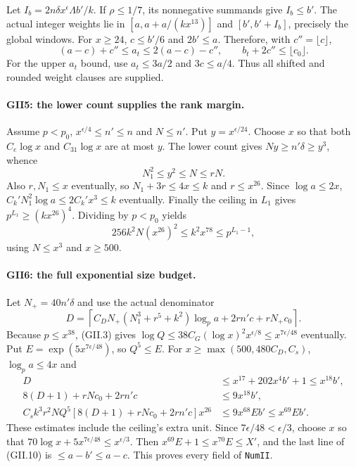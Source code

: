 Let $I_b=2n\delta x^\epsilon\Lambda b'/k$. If $\rho\le1/7$, its
nonnegative summands give $I_b\le b'$. The actual integer weights lie in
$[a,a+a/(kx^{13})]$ and $[b',b'+I_b]$, precisely the global windows.
For $x\ge24$, $c\le b'/6$ and $2b'\le a$. Therefore, with
$c''=\lfloor c\rfloor$,
\[
 (a-c)+c''\le a_t\le2(a-c)-c'',\qquad
 b_t+2c''\le\lfloor c_0\rfloor.\tag{GII.6}
\]
For the upper $a_t$ bound, use $a_t\le3a/2$ and $3c\le a/4$.
Thus all shifted and rounded weight clauses are supplied.

\paragraph{GII5: the lower count supplies the rank margin.}
Assume $p<p_0$, $x^{\epsilon/4}\le n'\le n$ and $N\le n'$.
Put $y=x^{\epsilon/24}$. Choose $x$ so that both $C_e\log x$ and
$C_{31}\log x$ are at most $y$. The lower count gives
$Ny\ge n'\delta\ge y^3$, whence
\[
 N_1^2\le y^2\le N\le rN.\tag{GII.7}
\]
Also $r,N_1\le x$ eventually, so $N_1+3r\le4x\le k$ and
$r\le x^{26}$. Since $\log a\le2x$,
$C_k'N_1^2\log a\le2C_k'x^3\le k$ eventually. Finally the ceiling in
$L_1$ gives $p^{L_1}\ge(kx^{26})^4$. Dividing by $p<p_0$ yields
\[
 256k^2N(x^{26})^2\le k^2x^{78}\le p^{L_1-1},\tag{GII.8}
\]
using $N\le x^3$ and $x\ge500$.

\paragraph{GII6: the full exponential size budget.}
Let $N_+=40n'\delta$ and use the actual denominator
\[
 D=\left\lceil C_DN_+(N_1^3+r^5+k^2)\log_pa
                 +2rn'c+rN_+c_0\right\rceil.\tag{GII.9}
\]
Because $p\le x^{38}$, (GII.3) gives
$\log Q\le38C_G(\log x)^2x^{\epsilon/8}\le x^{7\epsilon/48}$
eventually. Put $E=\exp(5x^{7\epsilon/48})$, so $Q^5\le E$.
For $x\ge\max(500,480C_D,C_s)$, $\log_pa\le4x$ and
\[
\begin{aligned}
 D&\le x^{17}+202x^4b'+1\le x^{18}b',\\
 8(D+1)+rNc_0+2rn'c&\le9x^{18}b',\\
 C_sk^3r^2NQ^5[8(D+1)+rNc_0+2rn'c]x^{26}
   &\le9x^{68}Eb'\le x^{69}Eb'.
\end{aligned}\tag{GII.10}
\]
These estimates include the ceiling's extra unit. Since
$7\epsilon/48<\epsilon/3$, choose $x$ so that
$70\log x+5x^{7\epsilon/48}\le x^{\epsilon/3}$. Then
$x^{69}E+1\le x^{70}E\le X'$, and the last line of (GII.10) is
$\le a-b'\le a-c$. This proves every field of \texttt{NumII}.


